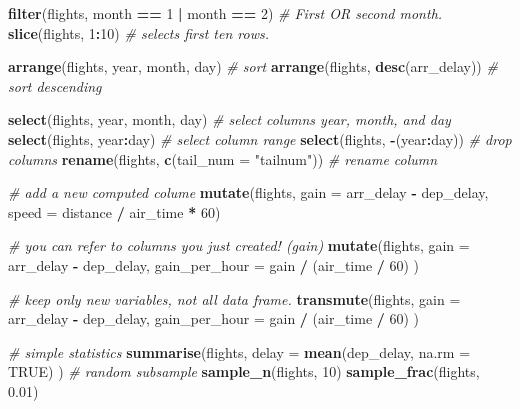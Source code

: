 \documentclass[]{book}
\newenvironment{Shaded}{\begin{snugshade}}{\end{snugshade}}
\newcommand{\KeywordTok}[1]{\textcolor[rgb]{0.13,0.29,0.53}{\textbf{#1}}}
\newcommand{\DataTypeTok}[1]{\textcolor[rgb]{0.13,0.29,0.53}{#1}}
\newcommand{\DecValTok}[1]{\textcolor[rgb]{0.00,0.00,0.81}{#1}}
\newcommand{\FloatTok}[1]{\textcolor[rgb]{0.00,0.00,0.81}{#1}}
\newcommand{\StringTok}[1]{\textcolor[rgb]{0.31,0.60,0.02}{#1}}
\newcommand{\CommentTok}[1]{\textcolor[rgb]{0.56,0.35,0.01}{\textit{#1}}}
\newcommand{\OtherTok}[1]{\textcolor[rgb]{0.56,0.35,0.01}{#1}}
\newcommand{\OperatorTok}[1]{\textcolor[rgb]{0.81,0.36,0.00}{\textbf{#1}}}
\newcommand{\NormalTok}[1]{#1}
\theoremstyle{definition}
\theoremstyle{definition}
\theoremstyle{definition}
\theoremstyle{remark}
\begin{document}
\begin{Shaded}
\begin{Highlighting}[]
\KeywordTok{filter}\NormalTok{(flights, month }\OperatorTok{==}\StringTok{ }\DecValTok{1} \OperatorTok{|}\StringTok{ }\NormalTok{month }\OperatorTok{==}\StringTok{ }\DecValTok{2}\NormalTok{) }\CommentTok{# First OR second month.}
\KeywordTok{slice}\NormalTok{(flights, }\DecValTok{1}\OperatorTok{:}\DecValTok{10}\NormalTok{) }\CommentTok{# selects first ten rows.}

\KeywordTok{arrange}\NormalTok{(flights, year, month, day) }\CommentTok{# sort}
\KeywordTok{arrange}\NormalTok{(flights, }\KeywordTok{desc}\NormalTok{(arr_delay)) }\CommentTok{# sort descending}

\KeywordTok{select}\NormalTok{(flights, year, month, day) }\CommentTok{# select columns year, month, and day}
\KeywordTok{select}\NormalTok{(flights, year}\OperatorTok{:}\NormalTok{day) }\CommentTok{# select column range}
\KeywordTok{select}\NormalTok{(flights, }\OperatorTok{-}\NormalTok{(year}\OperatorTok{:}\NormalTok{day)) }\CommentTok{# drop columns}
\KeywordTok{rename}\NormalTok{(flights, }\KeywordTok{c}\NormalTok{(}\DataTypeTok{tail_num =} \StringTok{"tailnum"}\NormalTok{)) }\CommentTok{# rename column}

\CommentTok{# add a new computed colume}
\KeywordTok{mutate}\NormalTok{(flights,}
  \DataTypeTok{gain =}\NormalTok{ arr_delay }\OperatorTok{-}\StringTok{ }\NormalTok{dep_delay,}
  \DataTypeTok{speed =}\NormalTok{ distance }\OperatorTok{/}\StringTok{ }\NormalTok{air_time }\OperatorTok{*}\StringTok{ }\DecValTok{60}\NormalTok{) }

\CommentTok{# you can refer to columns you just created! (gain)}
\KeywordTok{mutate}\NormalTok{(flights,}
  \DataTypeTok{gain =}\NormalTok{ arr_delay }\OperatorTok{-}\StringTok{ }\NormalTok{dep_delay,}
  \DataTypeTok{gain_per_hour =}\NormalTok{ gain }\OperatorTok{/}\StringTok{ }\NormalTok{(air_time }\OperatorTok{/}\StringTok{ }\DecValTok{60}\NormalTok{)}
\NormalTok{)}

\CommentTok{# keep only new variables, not all data frame.}
\KeywordTok{transmute}\NormalTok{(flights,}
  \DataTypeTok{gain =}\NormalTok{ arr_delay }\OperatorTok{-}\StringTok{ }\NormalTok{dep_delay,}
  \DataTypeTok{gain_per_hour =}\NormalTok{ gain }\OperatorTok{/}\StringTok{ }\NormalTok{(air_time }\OperatorTok{/}\StringTok{ }\DecValTok{60}\NormalTok{)}
\NormalTok{)}

\CommentTok{# simple statistics}
\KeywordTok{summarise}\NormalTok{(flights,}
  \DataTypeTok{delay =} \KeywordTok{mean}\NormalTok{(dep_delay, }\DataTypeTok{na.rm =} \OtherTok{TRUE}\NormalTok{)}
\NormalTok{  )}
\CommentTok{# random subsample }
\KeywordTok{sample_n}\NormalTok{(flights, }\DecValTok{10}\NormalTok{) }
\KeywordTok{sample_frac}\NormalTok{(flights, }\FloatTok{0.01}\NormalTok{) }
\end{Highlighting}
\end{Shaded}
\end{document}
